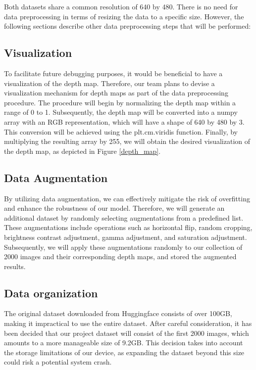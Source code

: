 \documentclass{article} %
\begin{document}
Both datasets share a common resolution of 640 by 480. There is no need for data preprocessing in terms of resizing the data to a specific size. However, 
the following sections describe other data preprocessing steps that will be performed:

\subsection{Visualization}
To facilitate future debugging purposes, it would be beneficial to have a visualization of the depth map. Therefore, our team plans to devise a visualization mechanism for depth maps as part of the data preprocessing procedure. The procedure will begin by normalizing the depth map within a range of 0 to 1. Subsequently, the depth map will be converted into a numpy array with an RGB representation, which will have a shape of 640 by 480 by 3. This conversion will be achieved using the plt.cm.viridis function. Finally, by multiplying the resulting array by 255, we will obtain the desired visualization of the depth map, as depicted in Figure \ref{depth_map}.


\subsection{Data Augmentation}
By utilizing data augmentation, we can effectively mitigate the risk of overfitting and enhance the robustness of our model. Therefore, we will generate an additional dataset by randomly selecting augmentations from a predefined list. These augmentations include operations such as horizontal flip, random cropping, brightness contrast adjustment, gamma adjustment, and saturation adjustment. Subsequently, we will apply these augmentations randomly to our collection of 2000 images and their corresponding depth maps, and stored the augmented results.



\subsection{Data organization}

The original dataset downloaded from Huggingface consists of over 100GB, making it impractical to use the entire dataset. After careful consideration, it has been decided that our project dataset will consist of the first 2000 images, which amounts to a more manageable size of 9.2GB. This decision takes into account the storage limitations of our device, as expanding the dataset beyond this size could risk a potential system crash.
\end{document}
